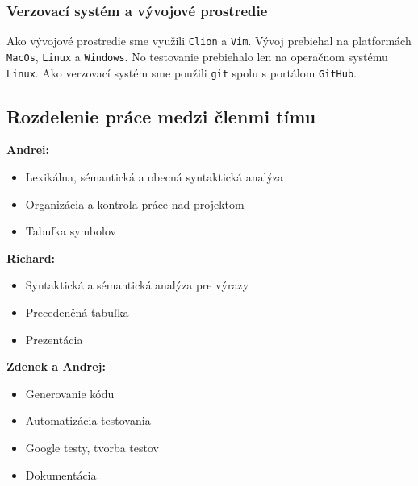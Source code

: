 \documentclass[a4paper, 11pt]{article}
\begin{document}
    \subsubsection{Verzovací systém a vývojové prostredie}
    Ako vývojové prostredie sme využili \texttt{Clion} a \texttt{Vim}. Vývoj prebiehal na platformách \texttt{MacOs}, \texttt{Linux} a \texttt{Windows}. No
    testovanie prebiehalo len na operačnom systému \texttt{Linux}. Ako verzovací systém sme použili \texttt{git} spolu s portálom
    \texttt{GitHub}.

    \subsection{Rozdelenie práce medzi členmi tímu}
    \leavevmode\newline
    \textbf{Andrei:}
    \begin{itemize}
        \item  Lexikálna, sémantická a obecná syntaktická analýza
        \item  Organizácia a kontrola práce nad projektom
        \item  Tabuľka symbolov
    \end{itemize}\leavevmode\newline
    \textbf{Richard:}
    \begin{itemize}
        \item  Syntaktická a sémantická analýza pre výrazy
        \item  \hyperref[sec: prec-tabulka]{Precedenčná tabuľka}
        \item  Prezentácia
    \end{itemize}\leavevmode\newline
    \textbf{Zdenek a Andrej:}
    \begin{itemize}
        \item  Generovanie kódu
        \item  Automatizácia testovania
        \item  Google testy, tvorba testov
        \item  Dokumentácia
    \end{itemize}


\end{document}
